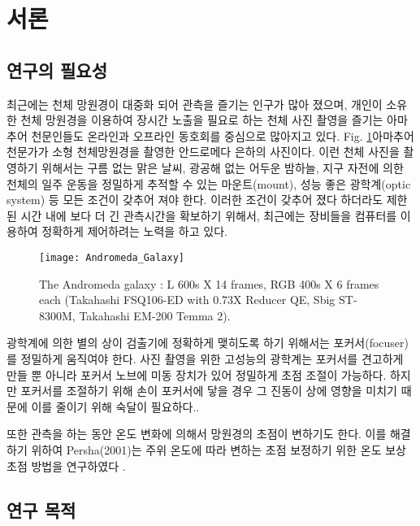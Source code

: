 \section{서론}

\subsection{연구의 필요성}

최근에는 천체 망원경이 대중화 되어 관측을 즐기는 인구가 많아 졌으며, 개인이 소유한 천체 망원경을 이용하여 장시간 노출을 필요로 하는 천체 사진 촬영을 즐기는 아마추어 천문인들도 온라인과 오프라인 동호회를 중심으로 많아지고 있다. Fig. \ref{fig:The_Andromeda_Galaxy}\은 아마추어 천문가가 소형 천체망원경을 촬영한 안드로메다 은하의 사진이다. 이런 천체 사진을 촬영하기 위해서는 구름 없는 맑은 날씨, 광공해 없는 어두운 밤하늘, 지구 자전에 의한 천체의 일주 운동을 정밀하게 추적할 수 있는 마운트(mount), 성능 좋은 광학계(optic system) 등 모든 조건이 갖추어 져야 한다. 이러한 조건이 갖추어 졌다 하더라도 제한된 시간 내에 보다 더 긴 관측시간을 확보하기 위해서, 최근에는 장비들을 컴퓨터를 이용하여 정확하게 제어하려는 노력을 하고 있다. 

\begin{figure}[H]
	\begin{center}
		\texttt{[image: Andromeda\_Galaxy]}
		\caption{The Andromeda galaxy : L 600s X 14 frames, RGB 400s X 6 frames each (Takahashi FSQ106-ED with 0.73X Reducer QE, Sbig ST-8300M, Takahashi EM-200 Temma 2).}
		\label{fig:The_Andromeda_Galaxy}
	\end{center}
\end{figure}

광학계에 의한 별의 상이 검출기에 정확하게 맺히도록 하기 위해서는 포커서(focuser)를 정밀하게 움직여야 한다. 사진 촬영을 위한 고성능의 광학계는 포커서를 견고하게 만들 뿐 아니라 포커서 노브에 미동 장치가 있어 정밀하게 초점 조절이 가능하다. 하지만 포커서를 조절하기 위해 손이 포커서에 닿을 경우 그 진동이 상에 영향을 미치기 때문에 이를 줄이기 위해 숙달이 필요하다.. 

또한 관측을 하는 동안 온도 변화에 의해서 망원경의 초점이 변하기도 한다. 이를 해결하기 위하여 Persha(2001)는 주위 온도에 따라 변하는 초점 보정하기 위한 온도 보상 초점 방법을 연구하였다 \cite{persha2001temperature}.


\subsection{연구 목적}

